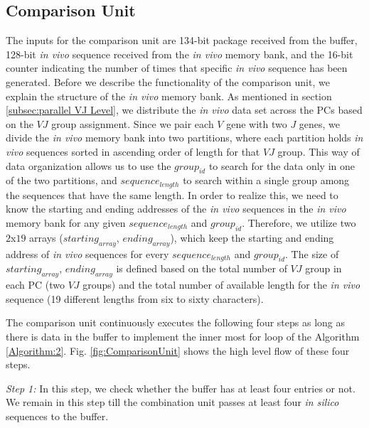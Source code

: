 \subsection{Comparison Unit }\label{subsec:Comp}
The inputs for the comparison unit are 134-bit package received from the buffer, 128-bit \emph{in vivo} sequence received from the \emph{in vivo} memory bank, and the 16-bit counter indicating the number of times that specific \emph{in vivo} sequence has been generated. Before we describe the functionality of the comparison unit, we explain the structure of the \emph{in vivo} memory bank. As mentioned in section \ref{subsec:parallel VJ Level}, we distribute the \emph{in vivo} data set across the PCs based on the $VJ$ group assignment. Since we pair each $V$ gene with two $J$ genes, we divide the \emph{in vivo} memory bank into two partitions, where each partition holds  \emph{in vivo} sequences sorted in ascending order of length for that $VJ$ group. This way of data organization allows us to use the $group_{id}$ to search for the data only in one of the two partitions, and $sequence_{length}$ to search within a single group among the sequences that have the same length. In order to realize this, we need to know the starting and ending addresses of the \emph{in vivo} sequences in the \emph{in vivo} memory bank for any given $sequence_{length}$ and $group_{id}$. Therefore, we utilize two $2$x$19$ arrays ($starting_{array}$, $ending_{array}$), which keep the starting and ending address of \emph{in vivo} sequences for every $sequence_{length}$ and $group_{id}$. The size of $starting_{array}$, $ending_{array}$ is defined based on the total number of $VJ$ group in each PC (two $VJ$ groups) and the total number of available length for the \emph{in vivo} sequence (19 different lengths from six to sixty characters).

The comparison unit continuously executes the following four steps as long as there is data in the buffer to implement the inner most for loop of the Algorithm \ref{Algorithm:2}. Fig. \ref{fig:ComparisonUnit} shows the high level flow of these four steps.

\emph{Step 1:} In this step, we check whether the buffer has at least four entries or not.  We remain in this step till the combination unit passes at least four \emph{in silico} sequences to the buffer.

